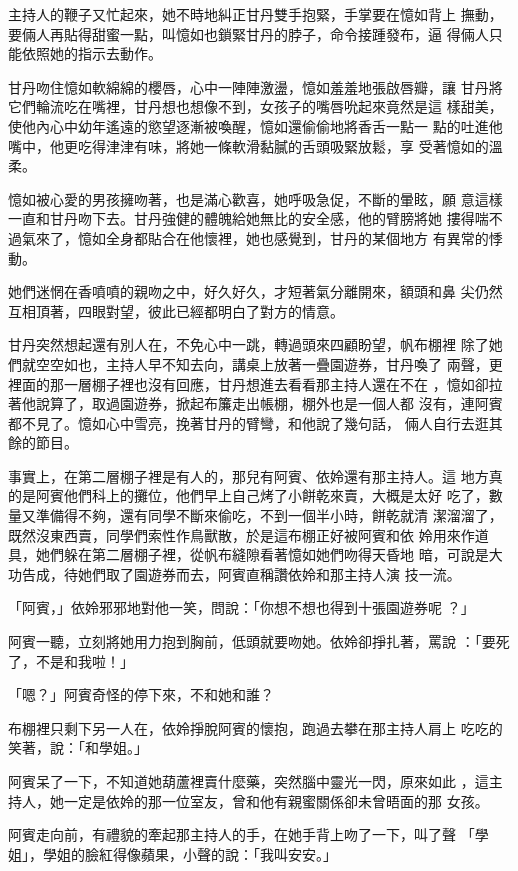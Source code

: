 主持人的鞭子又忙起來，她不時地糾正甘丹雙手抱緊，手掌要在憶如背上
撫動，要倆人再貼得甜蜜一點，叫憶如也鎖緊甘丹的脖子，命令接踵發布，逼
得倆人只能依照她的指示去動作。

甘丹吻住憶如軟綿綿的櫻唇，心中一陣陣激盪，憶如羞羞地張啟唇瓣，讓
甘丹將它們輪流吃在嘴裡，甘丹想也想像不到，女孩子的嘴唇吮起來竟然是這
樣甜美，使他內心中幼年遙遠的慾望逐漸被喚醒，憶如還偷偷地將香舌一點一
點的吐進他嘴中，他更吃得津津有味，將她一條軟滑黏膩的舌頭吸緊放鬆，享
受著憶如的溫柔。

憶如被心愛的男孩擁吻著，也是滿心歡喜，她呼吸急促，不斷的暈眩，願
意這樣一直和甘丹吻下去。甘丹強健的體魄給她無比的安全感，他的臂膀將她
摟得喘不過氣來了，憶如全身都貼合在他懷裡，她也感覺到，甘丹的某個地方
有異常的悸動。

她們迷惘在香噴噴的親吻之中，好久好久，才短著氣分離開來，額頭和鼻
尖仍然互相頂著，四眼對望，彼此已經都明白了對方的情意。

甘丹突然想起還有別人在，不免心中一跳，轉過頭來四顧盼望，帆布棚裡
除了她們就空空如也，主持人早不知去向，講桌上放著一疊園遊券，甘丹喚了
兩聲，更裡面的那一層棚子裡也沒有回應，甘丹想進去看看那主持人還在不在
，憶如卻拉著他說算了，取過園遊券，掀起布簾走出帳棚，棚外也是一個人都
沒有，連阿賓都不見了。憶如心中雪亮，挽著甘丹的臂彎，和他說了幾句話，
倆人自行去逛其餘的節目。

事實上，在第二層棚子裡是有人的，那兒有阿賓、依姈還有那主持人。這
地方真的是阿賓他們科上的攤位，他們早上自己烤了小餅乾來賣，大概是太好
吃了，數量又準備得不夠，還有同學不斷來偷吃，不到一個半小時，餅乾就清
潔溜溜了，既然沒東西賣，同學們索性作鳥獸散，於是這布棚正好被阿賓和依
姈用來作道具，她們躲在第二層棚子裡，從帆布縫隙看著憶如她們吻得天昏地
暗，可說是大功告成，待她們取了園遊券而去，阿賓直稱讚依姈和那主持人演
技一流。

「阿賓，」依姈邪邪地對他一笑，問說：「你想不想也得到十張園遊券呢
？」

阿賓一聽，立刻將她用力抱到胸前，低頭就要吻她。依姈卻掙扎著，罵說
：「要死了，不是和我啦！」

「嗯？」阿賓奇怪的停下來，不和她和誰？

布棚裡只剩下另一人在，依姈掙脫阿賓的懷抱，跑過去攀在那主持人肩上
吃吃的笑著，說：「和學姐。」

阿賓呆了一下，不知道她葫蘆裡賣什麼藥，突然腦中靈光一閃，原來如此
，這主持人，她一定是依姈的那一位室友，曾和他有親蜜關係卻未曾晤面的那
女孩。

阿賓走向前，有禮貌的牽起那主持人的手，在她手背上吻了一下，叫了聲
「學姐」，學姐的臉紅得像蘋果，小聲的說：「我叫安安。」

